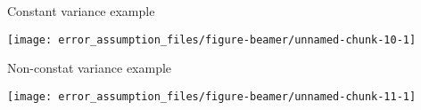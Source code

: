 \begin{frame}[fragile]{Constant variance example}
\protect\hypertarget{constant-variance-example}{}
\begin{Shaded}
\begin{Highlighting}[]
\NormalTok{(}\NormalTok{,}\NormalTok{,} \NormalTok{)}
\StringTok{ }\OperatorTok{*} \OperatorTok{+}\StringTok{ }\NormalTok{(}\NormalTok{)}
\NormalTok{(}\OperatorTok{\textasciitilde{}} \NormalTok{)}
\end{Highlighting}
\end{Shaded}

\begin{center}\texttt{[image: error\_assumption\_files/figure-beamer/unnamed-chunk-10-1]} \end{center}
\end{frame}

\begin{frame}[fragile]{Non-constat variance example}
\protect\hypertarget{non-constat-variance-example}{}
\begin{Shaded}
\begin{Highlighting}[]
\NormalTok{(}\NormalTok{,}\NormalTok{,} \NormalTok{)}
\StringTok{ }\OperatorTok{*}
\StringTok{ }\OperatorTok{+}\StringTok{ }\NormalTok{(}\NormalTok{(}\NormalTok{,}\NormalTok{, }\NormalTok{), }\NormalTok{(}\NormalTok{, }\NormalTok{, }\NormalTok{))}
\StringTok{ }\OperatorTok{\textasciitilde{}}
 \NormalTok{)}
\end{Highlighting}
\end{Shaded}

\begin{center}\texttt{[image: error\_assumption\_files/figure-beamer/unnamed-chunk-11-1]} \end{center}
\end{frame}

